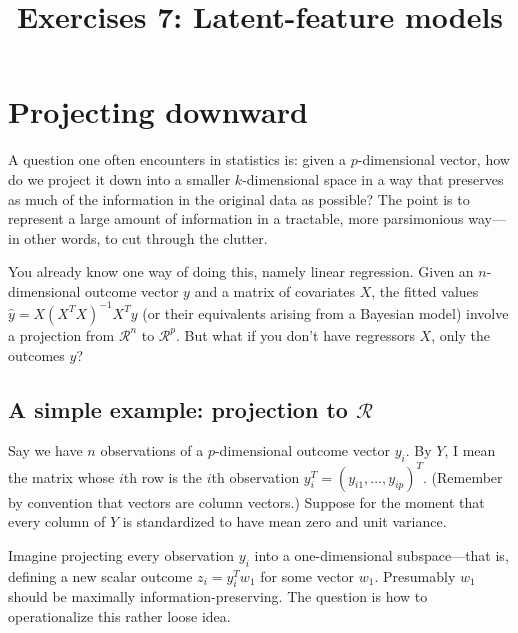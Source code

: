 \documentclass{mynotes}
\title[Exercises 6 $\cdot$ SSC 383D]{Exercises 7: Latent-feature models}
\date{}  %
\begin{document}
\maketitle%


\section{Projecting downward}

A question one often encounters in statistics is: given a $p$-dimensional vector, how do we project it down into a smaller $k$-dimensional space in a way that preserves as much of the information in the original data as possible? The point is to represent a large amount of information in a tractable, more parsimonious way---in other words, to cut through the clutter.

You already know one way of doing this, namely linear regression.  Given an $n$-dimensional outcome vector $y$ and a matrix of covariates $X$, the fitted values $\hat{y} = X (X^T X)^{-1} X^T y$ (or their equivalents arising from a Bayesian model) involve a projection from $\mathcal{R}^n$ to $\mathcal{R}^p$.  But what if you don't have regressors $X$, only the outcomes $y$?

\subsection{A simple example: projection to $\mathcal{R}$}

Say we have $n$ observations of a $p$-dimensional outcome vector $y_i$. By $Y$, I mean the matrix whose $i$th row is the $i$th observation $y_i^T = (y_{i1}, \ldots, y_{ip})^T$.  (Remember by convention that vectors are column vectors.) Suppose for the moment that every column of $Y$ is standardized to have mean zero and unit variance.

Imagine projecting every observation $y_i$ into a one-dimensional subspace---that is, defining a new scalar outcome $z_i = y_i^T w_1$ for some vector $w_1$.  Presumably $w_1$ should be maximally information-preserving.  The question is how to operationalize this rather loose idea.
\end{document}
